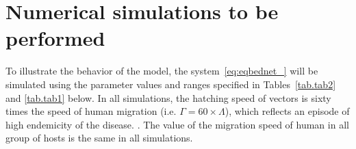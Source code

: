 \documentclass[a4paper]{article}
\begin{document}
 
\section{Numerical simulations to be performed}\label{sec:secsim}

To illustrate  the behavior of the model, the system~\eqref{eq:eqbednet_}  will be simulated using  the parameter values and ranges specified in  Tables~\ref{tab.tab2} and \ref{tab.tab1} below. 
In all simulations, the hatching speed of vectors is sixty times the speed of human migration  (i.e.  $\Gamma=60\times \Lambda$), which reflects an episode of high endemicity of the disease. . The value of the migration speed of human in all group of hosts is the same in all simulations.
\end{document}
